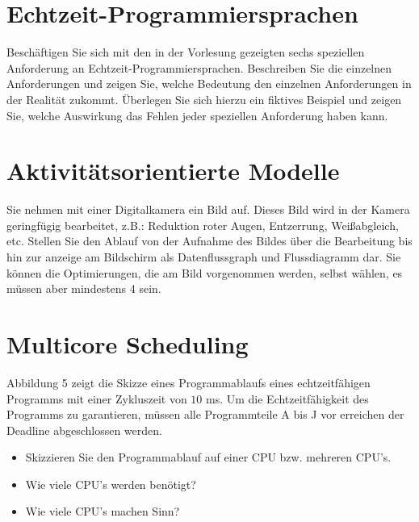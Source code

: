 \documentclass[12pt,a4paper,ngerman]{article}
\begin{document}
\section*{Echtzeit-Programmiersprachen}


\begin{framed}
Beschäftigen Sie sich mit den in der Vorlesung gezeigten sechs speziellen Anforderung an Echtzeit-Programmiersprachen. Beschreiben Sie die einzelnen Anforderungen und zeigen Sie, welche Bedeutung den einzelnen Anforderungen in der Realität zukommt. Überlegen Sie sich hierzu ein fiktives Beispiel und zeigen Sie, welche Auswirkung das Fehlen jeder speziellen Anforderung haben kann. 
\end{framed}
\pagebreak

\section*{Aktivitätsorientierte Modelle}


\begin{framed}
Sie nehmen mit einer Digitalkamera ein Bild auf. Dieses Bild wird in der Kamera geringfügig bearbeitet, z.B.: Reduktion roter Augen, Entzerrung, Weißabgleich, etc. Stellen Sie den Ablauf von der Aufnahme des Bildes über die Bearbeitung bis hin zur anzeige am Bildschirm als Datenflussgraph und Flussdiagramm dar. Sie können die Optimierungen, die am Bild vorgenommen werden, selbst wählen, es müssen aber mindestens 4 sein.
\end{framed}

\pagebreak

\section*{Multicore Scheduling}


\begin{framed}
Abbildung 5 zeigt die Skizze eines Programmablaufs eines echtzeitfähigen Programms mit einer Zykluszeit von $10$ ms. Um die Echtzeitfähigkeit des Programms zu garantieren, müssen alle Programmteile A bis J vor erreichen der Deadline abgeschlossen werden. \\
\begin{itemize}
\item Skizzieren Sie den Programmablauf auf einer CPU bzw. mehreren CPU's.
\item Wie viele CPU's werden benötigt?
\item Wie viele CPU's machen Sinn?
\end{itemize}
\end{framed}



   
   
\end{document}
